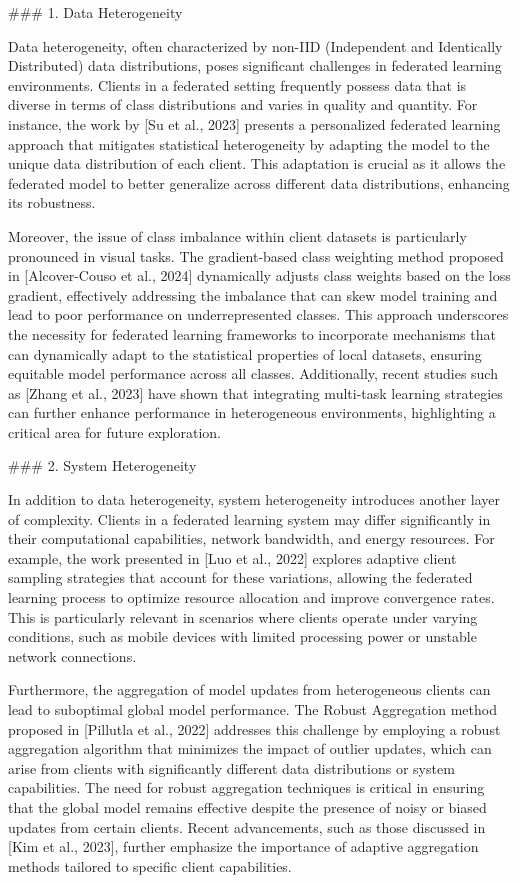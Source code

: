 \documentclass[journal]{IEEEtran}
\begin{document}
\#\#\# 1. Data Heterogeneity

Data heterogeneity, often characterized by non-IID (Independent and Identically Distributed) data distributions, poses significant challenges in federated learning environments. Clients in a federated setting frequently possess data that is diverse in terms of class distributions and varies in quality and quantity. For instance, the work by [Su et al., 2023] presents a personalized federated learning approach that mitigates statistical heterogeneity by adapting the model to the unique data distribution of each client. This adaptation is crucial as it allows the federated model to better generalize across different data distributions, enhancing its robustness.

Moreover, the issue of class imbalance within client datasets is particularly pronounced in visual tasks. The gradient-based class weighting method proposed in [Alcover-Couso et al., 2024] dynamically adjusts class weights based on the loss gradient, effectively addressing the imbalance that can skew model training and lead to poor performance on underrepresented classes. This approach underscores the necessity for federated learning frameworks to incorporate mechanisms that can dynamically adapt to the statistical properties of local datasets, ensuring equitable model performance across all classes. Additionally, recent studies such as [Zhang et al., 2023] have shown that integrating multi-task learning strategies can further enhance performance in heterogeneous environments, highlighting a critical area for future exploration.

\#\#\# 2. System Heterogeneity

In addition to data heterogeneity, system heterogeneity introduces another layer of complexity. Clients in a federated learning system may differ significantly in their computational capabilities, network bandwidth, and energy resources. For example, the work presented in [Luo et al., 2022] explores adaptive client sampling strategies that account for these variations, allowing the federated learning process to optimize resource allocation and improve convergence rates. This is particularly relevant in scenarios where clients operate under varying conditions, such as mobile devices with limited processing power or unstable network connections.

Furthermore, the aggregation of model updates from heterogeneous clients can lead to suboptimal global model performance. The Robust Aggregation method proposed in [Pillutla et al., 2022] addresses this challenge by employing a robust aggregation algorithm that minimizes the impact of outlier updates, which can arise from clients with significantly different data distributions or system capabilities. The need for robust aggregation techniques is critical in ensuring that the global model remains effective despite the presence of noisy or biased updates from certain clients. Recent advancements, such as those discussed in [Kim et al., 2023], further emphasize the importance of adaptive aggregation methods tailored to specific client capabilities.
\end{document}
